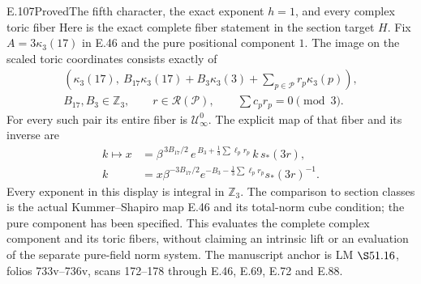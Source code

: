 \begin{statement}{E.107}{Proved}{The fifth character, the exact exponent \(h=1\), and every complex toric fiber}
Here is the exact complete fiber statement in the section target \(H\).
Fix \(A=3\kappa_3(17)\) in E.46 and the pure positional component \(1\).
The image on the scaled toric coordinates consists exactly of
\[
 \begin{gathered}
 \left(\kappa_3(17),\
 B_{17}\kappa_3(17)+B_3\kappa_3(3)+
                  \sum_{p\in\mathcal P}r_p\kappa_3(p)\right),\\
 B_{17},B_3\in\mathbb Z_3,\qquad
 r\in\mathscr R(\mathcal P),\qquad
 \sum c_pr_p=0\pmod3.
 \end{gathered}
 \tag{E107.13}
\]
For every such pair its entire fiber is \(\mathcal U_\infty^0\).
The explicit map of that fiber and its inverse are
\[
 \begin{aligned}
 k\longmapsto x
   &=\beta^{\,3B_{17}/2}\,
     e^{\,B_3+\frac13\sum\ell_pr_p}\,
     k\,s_*(3r),\\
 k&=x\beta^{-3B_{17}/2}
     e^{-B_3-\frac13\sum\ell_pr_p}s_*(3r)^{-1}.
 \end{aligned}
 \tag{E107.14}
\]
Every exponent in this display is integral in \(\mathbb Z_3\).
The comparison to section classes is the actual Kummer--Shapiro
map E.46 and its total-norm cube condition; the pure component
has been specified. This evaluates the complete complex component
and its toric fibers, without claiming an intrinsic lift or an
evaluation of the separate pure-field norm system.
The manuscript anchor is LM \(\S51.16\), folios 733v--736v,
scans 172--178 through E.46, E.69, E.72 and E.88.
\end{statement}

